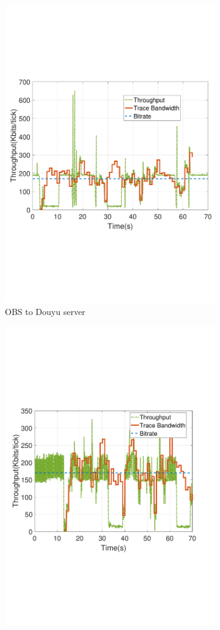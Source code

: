 \begin{figure}[htb]
\begin{subfigure}[b]{0.32\textwidth}
  \includegraphics[width=0.8\linewidth]{fig/obs_douyu.pdf}
  \caption{OBS to Douyu server}
  \label{fig:obs-douyu}
\end{subfigure}
\begin{subfigure}[b]{0.32\textwidth}
  \includegraphics[width=0.8\linewidth]{fig/douyu.pdf}

\end{subfigure}
\end{figure}
